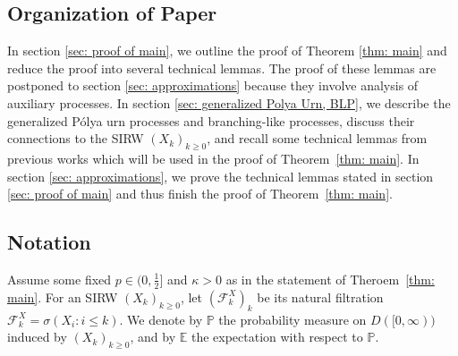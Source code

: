 \documentclass[twoside,12pt, a4paper]{article}
\numberwithin{equation}{section}
\theoremstyle{remark}
\begin{document}
	\subsection{Organization of Paper}
	In section \ref{sec: proof of main}, we outline the proof of Theorem \ref{thm: main} and reduce the proof into several technical lemmas. The proof of these lemmas are postponed to section \ref{sec: approximations} because they involve analysis of auxiliary processes. In section \ref{sec: generalized Polya Urn, BLP}, we describe the generalized P\'{o}lya urn processes and branching-like processes, discuss their connections to the SIRW $(X_k)_{k\geq 0}$, and recall some technical lemmas from previous works which will be used in the proof of Theorem~\ref{thm: main}. In section \ref{sec: approximations}, we prove the technical lemmas stated in section \ref{sec: proof of main} and thus finish the proof of Theorem~\ref{thm: main}. 
	
	\subsection{Notation}
	
	Assume some fixed $p \in (0,\frac{1}{2}]$ and $\kappa > 0$ as in the statement of Theroem~\ref{thm: main}. For an SIRW $(X_k)_{k\geq 0}$, let $(\mathcal{F}^X_k)_k$ be its natural filtration $\mathcal{F}^X_k = \sigma\left(X_i: i\leq k \right).$ 
	We denote by $\mathbb{P}$ the probability measure on $D([0,\infty))$ induced by $(X_k)_{k\geq 0}$, and by $\mathbb{E}$ the expectation with respect to $\mathbb{P}$.
	
\end{document}
